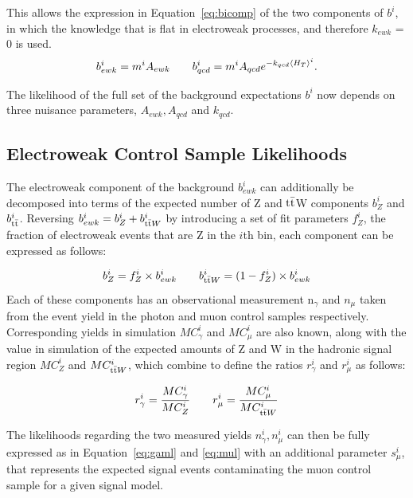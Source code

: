 This allows the expression in Equation~\ref{eq:bicomp} of the two components of $b^{i}$, in which the knowledge that \RaT is flat in electroweak processes, and therefore $k_{ewk}$ = 0 is used.
\begin{equation}
b^{i}_{ewk} = m^{i} A_{ewk} \qquad
b^{i}_{qcd} = m^{i} A_{qcd} e^{-k_{qcd} \langle H_{T} \rangle^{i}}.
\label{eq:bicomp}
\end{equation}

The likelihood of the full set of the background expectations $b^{i}$ now depends on three nuisance parameters, $A_{ewk}, A_{qcd}$ and $k_{qcd}$. 

\subsection{Electroweak Control Sample Likelihoods}
The electroweak component of the background $b^{i}_{ewk}$ can additionally be decomposed into terms of the expected number of Z and $\textrm{t}\bar{\textrm{t}}$W components $b^{i}_{Z}$ and  $b^{i}_{\textrm{t}\bar{\textrm{t}}}$. Reversing $b^{i}_{ewk} = b^{i}_{Z} + b^{i}_{\textrm{t}\bar{\textrm{t}} W}$ by introducing a set of fit parameters $f^{i}_{Z}$, the fraction of electroweak events that are Z in the $i$th bin, each component can be expressed as follows:

\begin{equation}
b^{i}_{Z}= f^{i}_{Z} \times b^{i}_{ewk} \qquad b^{i}_{\textrm{t}\bar{\textrm{t}} W}= (1 - f^{i}_{Z}) \times b^{i}_{ewk}
\label{eq:ewk1}
\end{equation}
 Each of these components has an observational measurement n$_{\gamma}$ and $n_{\mu}$ taken from the event yield in the photon and muon control samples respectively. Corresponding yields in simulation $MC^{i}_{\gamma}$ and $MC^{i}_{\mu}$ are also known, along with the value in simulation of the expected amounts of Z and \tto W in the hadronic signal region $MC^{i}_{Z}$ and $MC^{i}_{\textrm{t}\bar{\textrm{t}} W}$, which combine to define the ratios $r^{i}_{\gamma}$ and $r^{i}_{\mu}$ as follows:
 
 \begin{equation}
 r^{i}_{\gamma} = \frac{MC^{i}_{\gamma}}{MC^{i}_{Z}} \qquad  r^{i}_{\mu} = \frac{MC^{i}_{\mu}}{MC^{i}_{\textrm{t}\bar{\textrm{t}} W}} 
 \label{eq:ewk2}
 \end{equation}

The likelihoods regarding the two measured yields $n^{i}_{\gamma}, n^{i}_{\mu}$ can then be fully expressed as in Equation~\ref{eq:gaml} and \ref{eq:mul} with an additional parameter $s^{i}_{\mu}$, that represents the expected signal events contaminating the muon control sample for a given signal model. 

